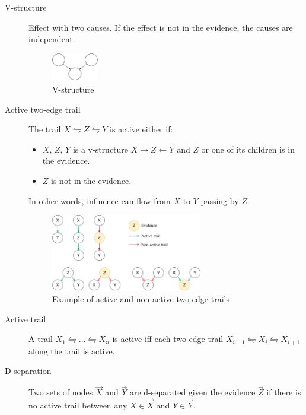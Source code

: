 \begin{description}
    \item[V-structure] 
        Effect with two causes.
        If the effect is not in the evidence, the causes are independent.

        \begin{figure}[H]
            \centering
            \includegraphics[width=0.2\textwidth]{img/_v_structure.pdf}
            \caption{V-structure}
        \end{figure}
    
    \item[Active two-edge trail] 
        The trail $X \leftrightharpoons Z \leftrightharpoons Y$ is active either if:
        \begin{itemize}
            \item $X$, $Z$, $Y$ is a v-structure $X \rightarrow Z \leftarrow Y$
                and $Z$ or one of its children is in the evidence.
            \item $Z$ is not in the evidence.
        \end{itemize}
        In other words, influence can flow from $X$ to $Y$ passing by $Z$.

        \begin{figure}[H]
            \centering
            \includegraphics[width=0.65\textwidth]{img/_active_trail.pdf}
            \caption{Example of active and non-active two-edge trails}
        \end{figure}
    
    \item[Active trail] 
        A trail $X_1 \leftrightharpoons \dots \leftrightharpoons X_n$ is active iff
        each two-edge trail $X_{i-1} \leftrightharpoons X_i \leftrightharpoons X_{i+1}$ along the trail is active.

    \item[D-separation] 
        Two sets of nodes $\vec{X}$ and $\vec{Y}$ are d-separated given the evidence $\vec{Z}$ if
        there is no active trail between any $X \in \vec{X}$ and $Y \in \vec{Y}$.


\end{description}
